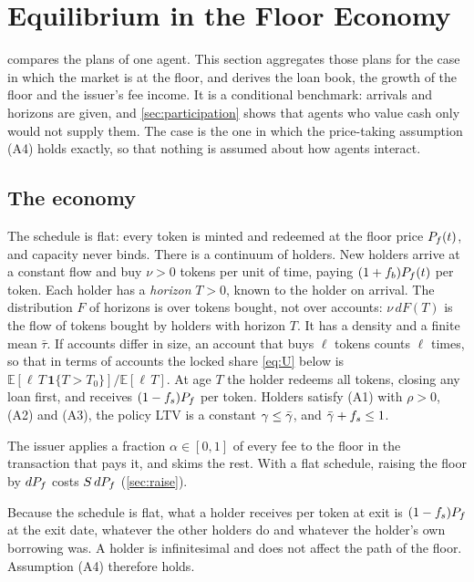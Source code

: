 \section{Equilibrium in the Floor Economy}\label{sec:equilibrium}

 compares the plans of one agent. This section aggregates those plans for the case in which the market is at the floor, and derives the loan book, the growth of the floor and the issuer's fee income. It is a conditional benchmark: arrivals and horizons are given, and \cref{sec:participation} shows that agents who value cash only would not supply them. The case is the one in which the price-taking assumption (A4) holds exactly, so that nothing is assumed about how agents interact.

\subsection{The economy}

The schedule is flat: every token is minted and redeemed at the floor price $P_f(t)$, and capacity never binds. There is a continuum of holders. New holders arrive at a constant flow and buy $\nu>0$ tokens per unit of time, paying $(1+f_b)P_f(t)$ per token. Each holder has a \emph{horizon} $T>0$, known to the holder on arrival. The distribution $F$ of horizons is over tokens bought, not over accounts: $\nu\,dF(T)$ is the flow of tokens bought by holders with horizon $T$. It has a density and a finite mean $\bar\tau$. If accounts differ in size, an account that buys $\ell$ tokens counts $\ell$ times, so that in terms of accounts the locked share \eqref{eq:U} below is $\mathbb E[\ell\,T\,\mathbf 1\{T>T_0\}]/\mathbb E[\ell\,T]$. At age $T$ the holder redeems all tokens, closing any loan first, and receives $(1-f_s)P_f$ per token. Holders satisfy (A1) with $\rho>0$, (A2) and (A3), the policy LTV is a constant $\gamma\le\bar\gamma$, and $\bar\gamma+f_s\le1$.

The issuer applies a fraction $\alpha\in[0,1]$ of every fee to the floor in the transaction that pays it, and skims the rest. With a flat schedule, raising the floor by $dP_f$ costs $S\,dP_f$ (\cref{sec:raise}).

Because the schedule is flat, what a holder receives per token at exit is $(1-f_s)P_f$ at the exit date, whatever the other holders do and whatever the holder's own borrowing was. A holder is infinitesimal and does not affect the path of the floor. Assumption (A4) therefore holds.

